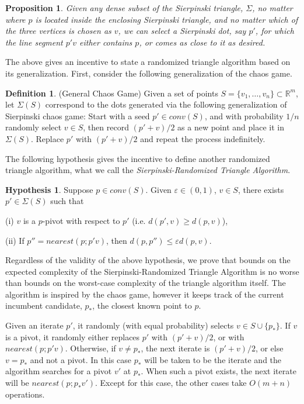 \documentclass{article}
\newtheorem{prop}{Proposition}
\theoremstyle{definition}
\newtheorem{definition}{Definition}
\newtheorem{hypothesis}{Hypothesis}
\begin{document}
\begin{prop}
Given any dense subset of the Sierpinski triangle, $\Sigma$, no matter where $p$ is located inside the enclosing Sierpinski triangle, and no matter which of the three vertices is chosen as $v$, we can select a Sierpinski dot, say $p'$, for which the line segment $p'v$ either contains $p$, or comes as close to it as desired.
\end{prop}

The above gives an incentive to state a randomized triangle algorithm based on its generalization. First, consider the following generalization of the chaos game.

\begin{definition}(General Chaos Game)
Given a set of points  $S= \{v_1, \dots, v_n\} \subset \mathbb{R} ^m$, let $\Sigma(S)$ correspond to the dots generated via the following generalization of Sierpinski chaos game: Start with a seed $p' \in conv(S)$, and with probability $1/n$ randomly select $v \in S$, then record $(p'+v)/2$ as a new point and place it in $\Sigma(S)$. Replace $p'$ with $(p'+v)/2$ and repeat the process indefinitely.
\end{definition}

The following hypothesis gives the incentive to define another randomized triangle algorithm, what we call the {\it Sierpinski-Randomized Triangle Algorithm}.

\begin{hypothesis}
Suppose $p \in conv(S)$. Given $\varepsilon \in (0,1)$, $v \in S$,  there exists $p' \in \Sigma(S)$ such that

(i) $v$ is a $p$-pivot with respect to $p'$ (i.e. $d(p',v) \geq d(p, v)$),

(ii)  If $p''=nearest(p;p'v)$, then $d(p,p'') \leq \varepsilon d(p,v)$.
\end{hypothesis}

Regardless of the validity of the above hypothesis, we prove that bounds on the expected complexity of the Sierpinski-Randomized Triangle Algorithm is no worse than bounds on the worst-case complexity of the triangle algorithm itself.  The algorithm is inspired by the chaos game, however it keeps track of the current incumbent candidate, $p_*$, the closest known point to $p$.

Given an iterate $p'$, it randomly (with equal probability) selects $v \in S \cup \{p_*\}$. If $v$ is a pivot, it randomly  either replaces $p'$ with $(p'+v)/2$, or with $nearest(p;p'v)$. Otherwise, if $v \not = p_*$, the next iterate is $(p'+v)/2$, or else $v= p_*$ and not a pivot. In this case $p_*$ will be taken to be the iterate and the algorithm searches for a pivot $v'$ at $p_*$.  When such a pivot exists, the next iterate will be $nearest(p;p_*v')$. Except for this case, the other cases take $O(m+n)$ operations.
\end{document}

